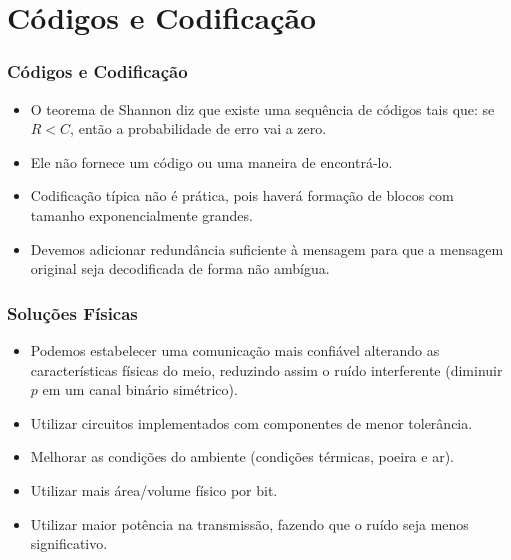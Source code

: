 \section{Códigos e Codificação}

\begin{frame}[allowframebreaks]
  \frametitle{Códigos e Codificação}
  \begin{itemize}
  \item O teorema de Shannon diz que existe uma sequência de códigos tais que:
	se $R < C$, então a probabilidade de erro vai a zero.
  \item Ele não fornece um código ou uma maneira de encontrá-lo.
  \item Codificação típica não é prática, pois haverá formação de blocos com tamanho exponencialmente grandes.
  \item Devemos adicionar redundância suficiente à mensagem para que a mensagem original
	seja decodificada de forma não ambígua.
  \end{itemize}
\end{frame}

\begin{frame}[allowframebreaks]
  \frametitle{Soluções Físicas}
  \begin{itemize}
  \item Podemos estabelecer uma comunicação mais confiável alterando as características físicas
	do meio, reduzindo assim o ruído interferente (diminuir $p$ em um canal binário simétrico).
  \item Utilizar circuitos implementados com componentes de menor tolerância.
  \item Melhorar as condições do ambiente (condições térmicas, poeira e ar).
  \item Utilizar mais área/volume físico por bit.
  \item Utilizar maior potência na transmissão, fazendo que o ruído seja menos significativo. 
  \end{itemize}
\end{frame}

